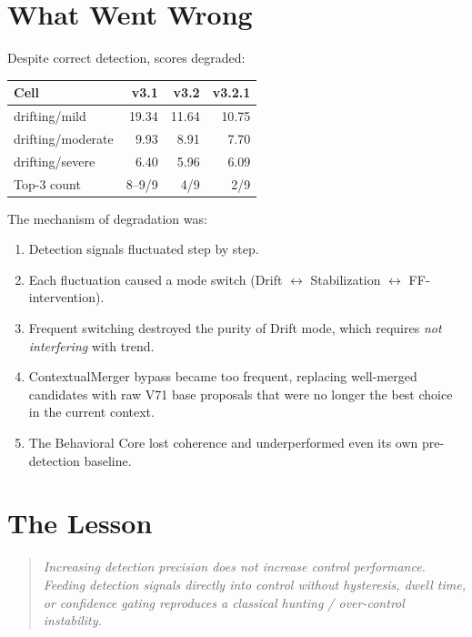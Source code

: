 \section{What Went Wrong}

Despite correct detection, scores degraded:

\begin{center}
\begin{tabular}{lrrr}
\toprule
\textbf{Cell} & \textbf{v3.1} & \textbf{v3.2} & \textbf{v3.2.1} \\
\midrule
drifting/mild     & 19.34 & 11.64 & 10.75 \\
drifting/moderate &  9.93 &  8.91 &  7.70 \\
drifting/severe   &  6.40 &  5.96 &  6.09 \\
\midrule
Top-3 count       & 8--9/9 & 4/9   & 2/9 \\
\bottomrule
\end{tabular}
\end{center}

The mechanism of degradation was:

\begin{enumerate}
  \item Detection signals fluctuated step by step.
  \item Each fluctuation caused a mode switch (Drift $\leftrightarrow$
    Stabilization $\leftrightarrow$ FF-intervention).
  \item Frequent switching destroyed the purity of Drift mode, which
    requires \emph{not interfering} with trend.
  \item ContextualMerger bypass became too frequent, replacing
    well-merged candidates with raw V71 base proposals that were no
    longer the best choice in the current context.
  \item The Behavioral Core lost coherence and underperformed even
    its own pre-detection baseline.
\end{enumerate}

\section{The Lesson}

\begin{quote}
\emph{Increasing detection precision does not increase control
performance. Feeding detection signals directly into control without
hysteresis, dwell time, or confidence gating reproduces a classical
hunting / over-control instability.}
\end{quote}

